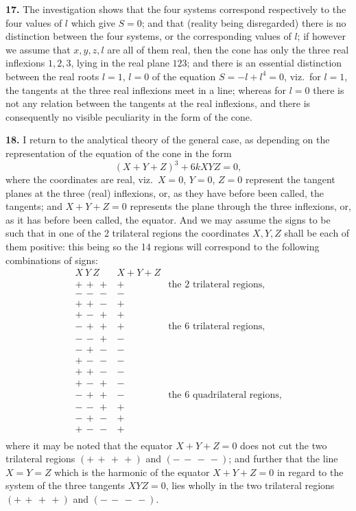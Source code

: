 \documentclass[11pt,a4paper]{article}
\begin{document}
\textbf{17.} The investigation shows that the four systems correspond respectively to the four values of $l$ which give $S = 0$; and that (reality being disregarded) there is no distinction between the four systems, or the corresponding values of $l$; if however we assume that $x, y, z, l$ are all of them real, then the cone has only the three real inflexions $1, 2, 3$, lying in the real plane $123$; and there is an essential distinction between the real roots $l = 1$, $l = 0$ of the equation $S = -l + l^{4} = 0$, viz.\ for $l = 1$, the tangents at the three real inflexions meet in a line; whereas for $l = 0$ there is not any relation between the tangents at the real inflexions, and there is consequently no visible peculiarity in the form of the cone.

\textbf{18.} I return to the analytical theory of the general case, as depending on the representation of the equation of the cone in the form
\[
(X + Y + Z)^{3} + 6kXYZ = 0,
\]
where the coordinates are real, viz.\ $X = 0$, $Y = 0$, $Z = 0$ represent the tangent planes at the three (real) inflexions, or, as they have before been called, the tangents; and $X + Y + Z = 0$ represents the plane through the three inflexions, or, as it has before been called, the equator. And we may assume the signs to be such that in one of the 2 trilateral regions the coordinates $X, Y, Z$ shall be each of them positive: this being so the 14 regions will correspond to the following combinations of signs:
\[
\begin{array}{c|c|l}
X\ Y\ Z & X + Y + Z & \\\hline
+\,+\,+ & + & \text{the 2 trilateral regions,}\\
-\,-\,- & - & \\\hline
+\,+\,- & + & \\
+\,-\,+ & + & \\
-\,+\,+ & + & \text{the 6 trilateral regions,}\\
-\,-\,+ & - & \\
-\,+\,- & - & \\
+\,-\,- & - & \\\hline
+\,+\,- & - & \\
+\,-\,+ & - & \\
-\,+\,+ & - & \text{the 6 quadrilateral regions,}\\
-\,-\,+ & + & \\
-\,+\,- & + & \\
+\,-\,- & + & \\
\end{array}
\]
where it may be noted that the equator $X + Y + Z = 0$ does not cut the two trilateral regions $(+\,+\,+\,+)$ and $(-\,-\,-\,-)$; and further that the line $X = Y = Z$ which is the harmonic of the equator $X + Y + Z = 0$ in regard to the system of the three tangents $XYZ = 0$, lies wholly in the two trilateral regions $(+\,+\,+\,+)$ and $(-\,-\,-\,-)$.
\end{document}
